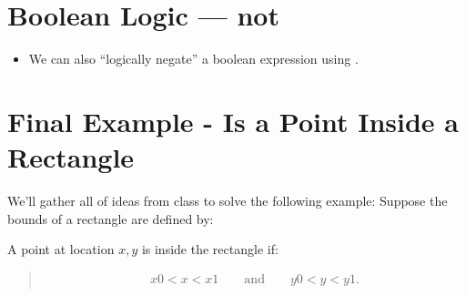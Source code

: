 \documentclass[letterpaper,10pt,english]{sphinxmanual}
\begin{document}
\section{Boolean Logic — not}
\label{\detokenize{lecture_notes/lec06_conditionals1:boolean-logic-not}}\begin{itemize}
\item {} 
We can also “logically negate” a boolean expression using .

\begin{sphinxVerbatim}[commandchars=\\\{\}]
  
  
    
\end{sphinxVerbatim}

\end{itemize}


\section{Final Example - Is a Point Inside a Rectangle}
\label{\detokenize{lecture_notes/lec06_conditionals1:final-example-is-a-point-inside-a-rectangle}}
We’ll gather all of ideas from class to solve the following example:
Suppose the bounds of a rectangle are defined by:
\begin{quote}

\begin{sphinxVerbatim}[commandchars=\\\{\}]
  
  
  
  
\end{sphinxVerbatim}
\end{quote}

A point at location \(x,y\) is inside the rectangle if:
\begin{quote}
\begin{equation*}
\begin{split}x0 < x < x1 \qquad \text{and} \qquad y0 < y < y1.\end{split}
\end{equation*}\end{quote}
\end{document}
